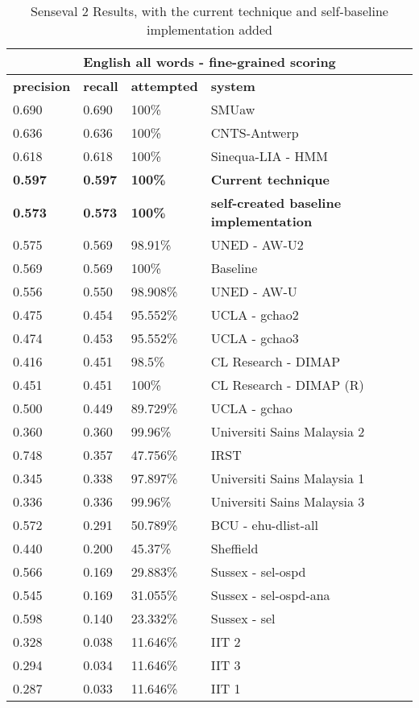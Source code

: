 \begin{table}[htp]
	\centering 
	\begin{tabular}{|l|l|l|l|}
		\hline
		  \multicolumn{4}{|c|}{\bf English all words - fine-grained scoring } \\
		\hline
		{\bf precision } & {\bf recall} & {\bf attempted} & {\bf system} \\ \hline 
		0.690	&	0.690	&	100\%	&		SMUaw \\ \hline
		0.636	&	0.636	&	100\%	&		CNTS-Antwerp \\ \hline
		0.618	&	0.618	&	100\%	&		Sinequa-LIA - HMM \\ \hline
		
		{\bf 0.597} & {\bf 0.597} & {\bf 100\% } &	{\bf Current technique} \\ \hline	
		
		{\bf 0.573} & {\bf 0.573} & {\bf 100\%} &	{\bf self-created baseline implementation } \\ \hline
		0.575	&	0.569	&	98.91\% &		UNED - AW-U2 \\ \hline
		0.569	&	0.569	&	100\%		&	Baseline \\ \hline
		0.556	&	0.550	&	98.908\%	&	UNED - AW-U	 \\ \hline
		0.475	&	0.454	&	95.552\%	&	UCLA - gchao2 \\ \hline
		0.474	&	0.453	&	95.552\%	&	UCLA - gchao3 \\ \hline
		0.416	&	0.451	&	98.5\%		&	CL Research - DIMAP	 \\ \hline
		0.451	&	0.451	&	100\%		&	CL Research - DIMAP (R)	 \\ \hline
		0.500	&	0.449	&	89.729\%	&	UCLA - gchao \\ \hline
		0.360	&	0.360	&	99.96\%		&	Universiti Sains Malaysia 2	 \\ \hline
		0.748	&	0.357	&	47.756\%	&	IRST \\ \hline
		0.345	&	0.338	&	97.897\%	&	Universiti Sains Malaysia 1 \\ \hline
		0.336	&	0.336	&	99.96\%		&	Universiti Sains Malaysia 3 \\ \hline
		0.572	&	0.291	&	50.789\%	&	BCU - ehu-dlist-all \\ \hline
		0.440	&	0.200	&	45.37\%		&	Sheffield \\ \hline
		0.566	&	0.169	&	29.883\%	&	Sussex - sel-ospd \\ \hline
		0.545	&	0.169	&	31.055\%	&	Sussex - sel-ospd-ana \\ \hline
		0.598	&	0.140	&	23.332\%	&	Sussex - sel \\ \hline
		0.328	&	0.038	&	11.646\%	&	IIT 2 \\ \hline
		0.294	&	0.034	&	11.646\%	&	IIT 3 \\ \hline
		0.287	&	0.033	&	11.646\%	&	IIT 1 \\ \hline
	\end{tabular}
	\caption{Senseval 2 Results, with the current technique and self-baseline implementation added \label{table:SENSEVAL2RESULTS}}
\end{table}

